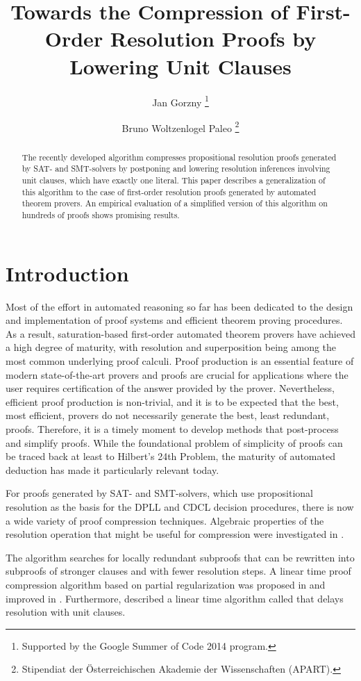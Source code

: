\documentclass{llncs}
\title{Towards the Compression of First-Order Resolution Proofs by Lowering Unit Clauses}
\author{
  Jan Gorzny\inst{1}
  \thanks{Supported by the Google Summer of Code 2014 program.}
  \and 
  Bruno Woltzenlogel Paleo\inst{2}
  \thanks{Stipendiat der \"Osterreichischen Akademie der Wissenschaften (APART).}
}
\institute{
  \email{jgorzny@uvic.ca}, University of Victoria, Canada
  \and 
  \email{bruno@logic.at}, Vienna University of Technology, Austria
}
\begin{document}
\maketitle


\begin{abstract}
The recently developed {\LowerUnits} algorithm compresses
propositional resolution proofs generated by SAT- and SMT-solvers by postponing and lowering resolution inferences involving unit clauses, which have exactly one literal. This paper describes a generalization of this algorithm to the case of first-order resolution proofs generated by automated theorem provers. An empirical evaluation of a simplified version of this algorithm on hundreds of proofs shows promising results.
\end{abstract}


\setcounter{footnote}{0}

\section{Introduction}

Most of the effort in automated reasoning so far has been dedicated to the design and implementation of proof systems and efficient theorem proving procedures. As a result, saturation-based first-order automated theorem provers have achieved a high degree of maturity, with resolution and superposition being among the most common underlying proof calculi. Proof production is an essential feature of modern state-of-the-art provers and proofs are crucial for applications where the user requires certification of the answer provided by the prover. Nevertheless, efficient proof production is 
non-trivial,
and it is to be expected that the best, most efficient, provers do not necessarily generate the best, least redundant, proofs. Therefore, it is a timely moment to develop methods that post-process and simplify proofs. While the foundational problem of simplicity of proofs can be traced back at least to Hilbert's 24th Problem, the maturity of automated deduction has made it particularly relevant today.  

For proofs generated by SAT- and SMT-solvers, which use propositional resolution as the basis for the DPLL and CDCL decision procedures, there is now a wide variety of proof compression techniques. Algebraic properties of the resolution
operation that might be useful for compression were investigated in \cite{bwp10}.

The {\ReduceReconstruct} algorithm \cite{RedRec} searches for locally redundant
subproofs that can be rewritten into subproofs of stronger clauses and with fewer resolution steps.
A linear time proof compression algorithm based on partial
regularization was proposed in \cite{RP08} and improved in \cite{LURPI}. Furthermore, \cite{LURPI} described a linear time algorithm called {\LowerUnits} that delays resolution with unit clauses.
\end{document}
